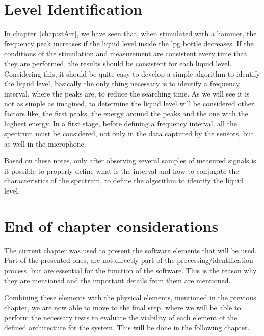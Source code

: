 \section{Level Identification}
In chapter~\ref{chap:stArt}, we have seen that, when stimulated with a hammer, the frequency peak increases if the liquid level inside the \acrshort{lpg} bottle decreases. If the conditions of the stimulation and measurement are consistent every time that they are performed, the results should be consistent for each liquid level. Considering this, it should be quite easy to develop a simple algorithm to identify the liquid level, basically the only thing necessary is to identify a frequency interval, where the peaks are, to reduce the searching time. As we will see it is not as simple as imagined, to determine the liquid level will be considered other factors like, the first peaks, the energy around the peaks and the one with the highest energy. In a first stage, before defining a frequency interval, all the spectrum must be considered, not only in the data captured by the sensors, but as well in the microphone.

Based on these notes, only after observing several samples of measured signals is it possible to properly define what is the interval and how to conjugate the characteristics of the spectrum, to define the algorithm to identify the liquid level. 
\section{End of chapter considerations}
The current chapter was used to present the software elements that will be used. Part of the presented ones, are not directly part of the processing/identification process, but are essential for the function of the software. This is the reason why they are mentioned and the important details from them are mentioned.

Combining these elements with the physical elements, mentioned in the previous chapter, we are now able to move to the final step, where we will be able to perform the necessary tests to evaluate the viability of each element of the defined architecture for the system. This will be done in the following chapter.
